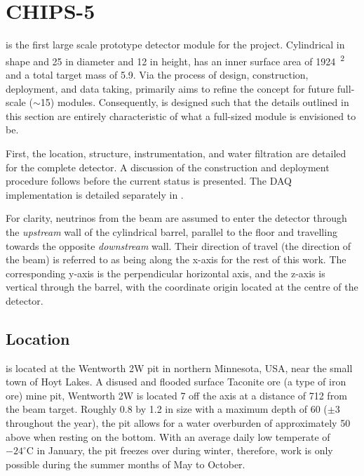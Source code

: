 \section{CHIPS-5} %
\label{sec:chips_detector} %

\chipsfive is the first large scale prototype detector module for the \chips project. Cylindrical
in shape and \SI{25}{} in diameter and \SI{12}{} in height, \chipsfive has an
inner surface area of \SI{1924}{^2} and a total target mass of \SI{5.9}{}. Via
the process of design, construction, deployment, and data taking, \chipsfive primarily aims to
refine the \chips concept for future full-scale ($\sim$\SI{15}{}) modules. Consequently,
\chipsfive is designed such that the details outlined in this section are entirely characteristic
of what a full-sized \chips module is envisioned to be.

First, the location, structure, instrumentation, and water filtration are detailed for the
complete detector. A discussion of the construction and deployment procedure follows before the
current status is presented. The \chipsfive DAQ implementation is detailed separately in
.

For clarity, neutrinos from the \numi beam are assumed to enter the \chipsfive detector through
the \emph{upstream} wall of the cylindrical barrel, parallel to the floor and travelling towards
the opposite \emph{downstream} wall. Their direction of travel (the direction of the beam) is
referred to as being along the x-axis for the rest of this work. The corresponding y-axis is the
perpendicular horizontal axis, and the z-axis is vertical through the barrel, with the coordinate
origin located at the centre of the detector.

\subsection{Location} %
\label{sec:chips_detector_location} %

\chipsfive is located at the Wentworth 2W pit in northern Minnesota, USA, near the small town of
Hoyt Lakes. A disused and flooded surface Taconite ore (a type of iron ore) mine pit, Wentworth 2W
is located \SI{7}{} off the \numi axis at a distance of \SI{712}{} from the
beam target. Roughly \SI{0.8}{} by \SI{1.2}{} in size with a maximum depth of
\SI{60}{} ($\pm$\SI{3}{} throughout the year), the pit allows for a water
overburden of approximately \SI{50}{} above \chipsfive when resting on the bottom. With an
average daily low temperate of $-24^{\circ}\text{C}$ in January, the pit freezes over during
winter, therefore, work is only possible during the summer months of May to October.

